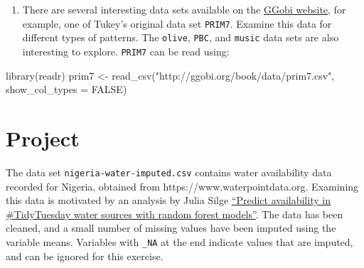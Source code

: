 \documentclass[
  letterpaper,
]{krantz}
\newenvironment{Shaded}{\begin{snugshade}}{\end{snugshade}}
\newcommand{\AttributeTok}[1]{\textcolor[rgb]{0.40,0.45,0.13}{#1}}
\newcommand{\ConstantTok}[1]{\textcolor[rgb]{0.56,0.35,0.01}{#1}}
\newcommand{\FunctionTok}[1]{\textcolor[rgb]{0.28,0.35,0.67}{#1}}
\newcommand{\NormalTok}[1]{\textcolor[rgb]{0.00,0.23,0.31}{#1}}
\newcommand{\OtherTok}[1]{\textcolor[rgb]{0.00,0.23,0.31}{#1}}
\newcommand{\StringTok}[1]{\textcolor[rgb]{0.13,0.47,0.30}{#1}}
\providecommand{\tightlist}{%
  \setlength{\itemsep}{0pt}\setlength{\parskip}{0pt}}
\begin{document}
\begin{enumerate}
  \begin{enumerate}
  \def\labelenumii{\alph{enumii}.}
  \tightlist
  \item
    Using a grand tour of the physical variables (\texttt{FL},
    \texttt{RW}, \texttt{CL}, \texttt{CW}, \texttt{BD}) variables in the
    \texttt{crabs} data with the points coloured by species
    (\texttt{sp}) what can you see? Is there a difference in the
    species? (Note that for this data you don't need to standardise. All
    are measured in the same units, and are not too different in scale,
    so the associations can still be seen well enough.)
  \item
    Using a grand tour of the chemical \% (\texttt{Na}:\texttt{Fe})
    variables in the \texttt{fgl} data with the points coloured by
    \texttt{type} what can you see? Is there a difference in the types
    of glass? (Here, the variables need to be standardised. Even though
    they are \%'s, the different amounts of each impede the ability to
    assess the associations without rescaling.)
  \end{enumerate}
\item
  There are several interesting data sets available on the
  \href{http://ggobi.org/book/index.html}{GGobi website}, for example,
  one of Tukey's original data set \texttt{PRIM7}. Examine this data for
  different types of patterns. The \texttt{olive}, \texttt{PBC}, and
  \texttt{music} data sets are also interesting to explore.
  \texttt{PRIM7} can be read using:
\end{enumerate}

\begin{Shaded}
\begin{Highlighting}[]
\FunctionTok{library}\NormalTok{(readr)}
\NormalTok{prim7 }\OtherTok{\textless{}{-}} \FunctionTok{read\_csv}\NormalTok{(}\StringTok{"http://ggobi.org/book/data/prim7.csv"}\NormalTok{,}
                  \AttributeTok{show\_col\_types =} \ConstantTok{FALSE}\NormalTok{)}
\end{Highlighting}
\end{Shaded}

\section*{Project}\label{project}


The data set \texttt{nigeria-water-imputed.csv} contains water
availability data recorded for Nigeria, obtained from
https://www.waterpointdata.org. Examining this data is motivated by an
analysis by Julia Silge
\href{https://juliasilge.com/blog/water-sources/}{``Predict availability
in \#TidyTuesday water sources with random forest models''}. The data
has been cleaned, and a small number of missing values have been imputed
using the variable means. Variables with \texttt{\_NA} at the end
indicate values that are imputed, and can be ignored for this exercise.
\end{document}
